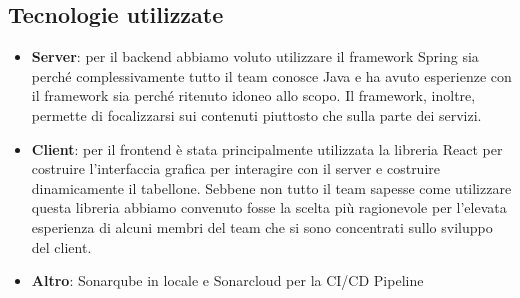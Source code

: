 \documentclass{article}
\begin{document}
\subsection{Tecnologie utilizzate}
\begin{itemize}
	\item \textbf{Server}: per il backend abbiamo voluto utilizzare il framework Spring sia perché complessivamente tutto il team conosce Java e ha avuto esperienze con il framework sia perché ritenuto idoneo allo scopo. Il framework, inoltre, permette di focalizzarsi sui contenuti piuttosto che sulla parte dei servizi.


	\item \textbf{Client}: per il frontend è stata principalmente utilizzata la libreria React per costruire l'interfaccia grafica per interagire con il server e costruire dinamicamente il tabellone.
	Sebbene non tutto il team sapesse come utilizzare questa libreria abbiamo convenuto fosse la scelta più ragionevole per l'elevata esperienza di alcuni membri del team che si sono concentrati sullo sviluppo del client.
	
	\item \textbf{Altro}: Sonarqube in locale e Sonarcloud per la CI/CD Pipeline
\end{itemize}
\end{document}
